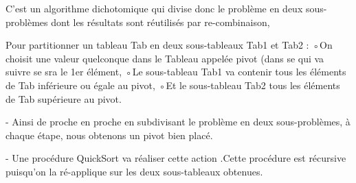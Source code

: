 \documentclass[12pt]{article}
\begin{document}
 C'est un algorithme dichotomique qui divise donc le problème en deux sous-problèmes dont les résultats sont réutilisés par re-combinaison,

Pour partitionner un tableau Tab en deux sous-tableaux Tab1 et Tab2 :
◦On choisit une valeur quelconque dans le Tableau appelée pivot (dans se qui va suivre se sra le 1er élément,
◦Le sous-tableau Tab1 va contenir tous les éléments de Tab inférieure ou égale au pivot,
◦Et le sous-tableau Tab2 tous les éléments de Tab supérieure au pivot.

- Ainsi de proche en proche en subdivisant le problème en deux sous-problèmes, à chaque étape, nous obtenons un pivot bien placé.

- Une procédure QuickSort va réaliser cette action .Cette procédure est récursive puisqu'on la ré-applique sur les deux sous-tableaux obtenues.
 
\end{document}
